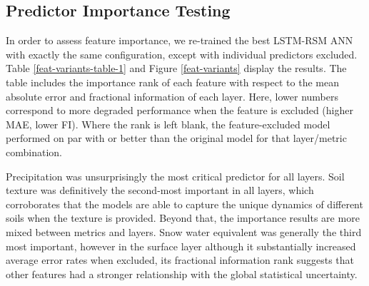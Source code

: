 \subsection{Predictor Importance Testing}

In order to assess feature importance, we re-trained the best LSTM-RSM ANN with exactly the same configuration, except with individual predictors excluded. Table \ref{feat-variants-table-1} and Figure \ref{feat-variants} display the results. The table includes the importance rank of each feature with respect to the mean absolute error and fractional information of each layer. Here, lower numbers correspond to more degraded performance when the feature is excluded (higher MAE, lower FI). Where the rank is left blank, the feature-excluded model performed on par with or better than the original model for that layer/metric combination.

Precipitation was unsurprisingly the most critical predictor for all layers. Soil texture was definitively the second-most important in all layers, which corroborates that the models are able to capture the unique dynamics of different soils when the texture is provided. Beyond that, the importance results are more mixed between metrics and layers. Snow water equivalent was generally the third most important, however in the surface layer although it substantially increased average error rates when excluded, its fractional information rank suggests that other features had a stronger relationship with the global statistical uncertainty.

